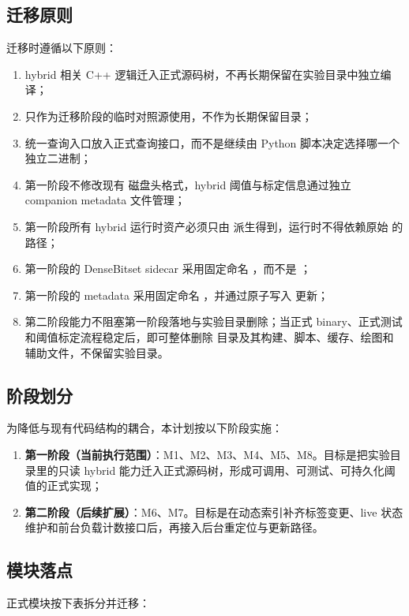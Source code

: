 \documentclass[UTF8]{ctexart}
\begin{document}
\subsection{迁移原则}
迁移时遵循以下原则：

\begin{enumerate}
\item hybrid 相关 C++ 逻辑迁入正式源码树，不再长期保留在实验目录中独立编译；
\item {} 只作为迁移阶段的临时对照源使用，不作为长期保留目录；
\item 统一查询入口放入正式查询接口，而不是继续由 Python 脚本决定选择哪一个独立二进制；
\item 第一阶段不修改现有  磁盘头格式，hybrid 阈值与标定信息通过独立 companion metadata 文件管理；
\item 第一阶段所有 hybrid 运行时资产必须只由  派生得到，运行时不得依赖原始  的路径；
\item 第一阶段的 DenseBitset sidecar 采用固定命名 ，而不是 ；
\item 第一阶段的 metadata 采用固定命名 ，并通过原子写入  更新；
\item 第二阶段能力不阻塞第一阶段落地与实验目录删除；当正式 binary、正式测试和阈值标定流程稳定后，即可整体删除  目录及其构建、脚本、缓存、绘图和辅助文件，不保留实验目录。
\end{enumerate}

\subsection{阶段划分}
为降低与现有代码结构的耦合，本计划按以下阶段实施：

\begin{enumerate}
\item \textbf{第一阶段（当前执行范围）}：M1、M2、M3、M4、M5、M8。目标是把实验目录里的只读 hybrid 能力迁入正式源码树，形成可调用、可测试、可持久化阈值的正式实现；
\item \textbf{第二阶段（后续扩展）}：M6、M7。目标是在动态索引补齐标签变更、live 状态维护和前台负载计数接口后，再接入后台重定位与更新路径。
\end{enumerate}

\subsection{模块落点}
正式模块按下表拆分并迁移：
\end{document}
